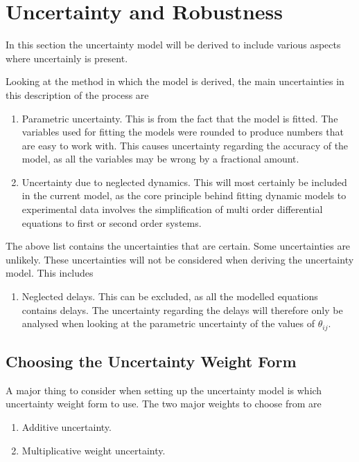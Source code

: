 \section{Uncertainty and Robustness}

In this section the uncertainty model will be derived to include various aspects where uncertainly is present.

Looking at the method in which the model is derived, the main uncertainties in this description of the process are

\begin{enumerate}
	\item  Parametric uncertainty. This is from the fact that the model is fitted. The variables used for fitting the models were rounded to produce numbers that are easy to work with. This causes uncertainty regarding the accuracy of the model, as all the variables may be wrong by a fractional amount.
	\item Uncertainty due to neglected dynamics. This will most certainly be included in the current model, as the core principle behind fitting dynamic models to experimental data involves the simplification of multi order differential equations to first or second order systems. 
\end{enumerate}

The above list contains the uncertainties that are certain. Some uncertainties are unlikely. These uncertainties will not be considered when deriving the uncertainty model. This includes

\begin{enumerate}
	\item Neglected delays. This can be excluded, as all the modelled equations contains delays. The uncertainty regarding the delays will therefore only be analysed when looking at the parametric uncertainty of the values of $\theta_{ij}$.
\end{enumerate}

\subsection{Choosing the Uncertainty Weight Form}

A major thing to consider when setting up the uncertainty model is which uncertainty weight form to use. The two major weights to choose from are

\begin{enumerate}
	\item Additive uncertainty.
	\item Multiplicative weight uncertainty.
\end{enumerate}

